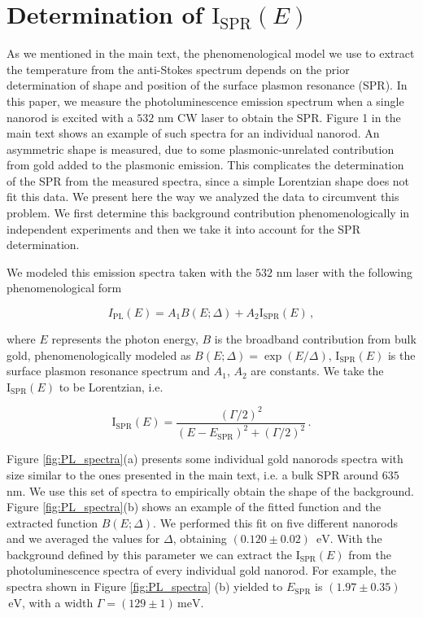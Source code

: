\documentclass[journal=nalefd,manuscript=letter]{achemso}
\newcommand{\nm}{\ensuremath{\,\textrm{nm}}}
\newcommand{\eV}{\ensuremath{\,\textrm{eV}}}
\newcommand{\meV}{\ensuremath{\,\textrm{meV}}}
\begin{document}
\pagebreak
\section{Determination of $\textrm{I}_\textrm{SPR}(E)$}\label{sec:ISPR} 

As we mentioned in the main text, the phenomenological model we use to extract
the temperature from the anti-Stokes spectrum depends on the prior determination 
of shape and position of the surface plasmon resonance (SPR). 
In this paper, we measure the photoluminescence emission spectrum 
when a single nanorod is excited with a $532\,\nm$ CW laser to obtain the SPR. 
Figure 1 in the main text shows an example of such spectra for an individual nanorod. 
An asymmetric shape is measured, due to some plasmonic-unrelated contribution 
from gold\cite{Mooradian1969} added to the plasmonic emission. 
This complicates the determination of the SPR from the measured spectra, since a simple 
Lorentzian shape does not fit this data. 
We present here the way we analyzed the data to circumvent this problem.
We first determine this background contribution phenomenologically in independent experiments and then 
we take it into account for the SPR determination. 

We modeled this emission spectra taken with the $532$ nm laser with the following phenomenological form

\begin{equation}
I_{\textrm{PL}}(E) = A_1 B(E;\Delta) + A_2 \textrm{I}_\textrm{SPR}(E)\,,
\label{eq:spectra_model}
\end{equation}

where $E$ represents the photon energy, $B$ is the broadband contribution from bulk gold, 
phenomenologically modeled as $B(E;\Delta) = \exp(E/\Delta)$, $\textrm{I}_\textrm{SPR}(E)$ 
is the surface plasmon resonance spectrum and $A_1$, $A_2$ are constants. 
We take the $\textrm{I}_\textrm{SPR}(E)$ to be Lorentzian\cite{Zijlstra2011}, i.e.  

\begin{equation}
\textrm{I}_{\textrm{SPR}}(E) = 
	\frac{\left( \Gamma/2 \right)^2}{\left( E-E_\textrm{SPR}\right)^2 +\left( \Gamma/2 \right)^2}\,.
\label{eq:ISPR}
\end{equation}

Figure \ref{fig:PL_spectra}(a) presents some individual gold nanorods spectra with 
size similar to the ones presented in the main text, i.e. a bulk SPR around $635$ nm. 
We use this set of spectra to empirically obtain the shape of the background.
Figure \ref{fig:PL_spectra}(b) shows an example of the fitted function and the extracted 
function $B(E;\Delta)$. We performed this fit on five different nanorods and we averaged 
the values for $\Delta$, obtaining $(0.120\pm0.02)$ \eV. With the background defined by 
this parameter we can extract the $\textrm{I}_{\textrm{SPR}}(E)$ from the photoluminescence 
spectra of every individual gold nanorod. For example, the spectra shown in Figure 
\ref{fig:PL_spectra} (b) yielded to $E_\textrm{SPR}$ is $(1.97 \pm 0.35)$ \eV, 
with a width $\Gamma=(129 \pm 1) \meV$.
\end{document}
